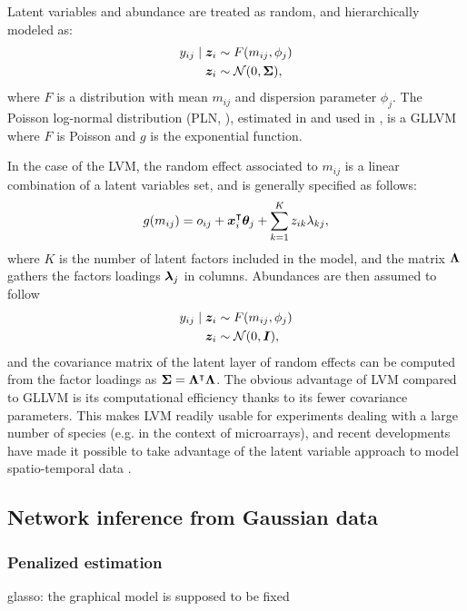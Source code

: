  Latent variables and abundance are treated as random, and hierarchically modeled as:
 \begin{align*}
 y_{ij}\mid {\boldsymbol{z}}_i &\sim F(m_{ij}, \phi_j)\\
 {\boldsymbol{z}}_i &\sim \mathcal{N}(0, {\boldsymbol{\Sigma}}),
 \end{align*} 
 where $F$ is a distribution with mean $m_{ij}$ and dispersion parameter $\phi_j$. The Poisson log-normal distribution (PLN, \citet{AiH89}), estimated in \citet{CMR18} and used in \citet{MRA20}, is a GLLVM where $F$ is Poisson and $g$ is the exponential function.  
 
In the case of the LVM, the random effect associated to $m_{ij}$ is a linear combination of a latent variables set, and is generally specified as follows:
 $$g(m_{ij}) = o_{ij}+{\boldsymbol{x}}_i^\intercal  {\boldsymbol{\theta}}_j +\sum_{k=1}^K z_{ik} \lambda_{kj},$$
 where $K$ is the number of latent factors included in the model, and the matrix ${\boldsymbol{\Lambda}}$ gathers the factors loadings ${\boldsymbol{\lambda}}_j$ in columns. Abundances are then assumed to follow
 \begin{align*}
 y_{ij}\mid {\boldsymbol{z}}_i &\sim F(m_{ij}, \phi_j)\\
{\boldsymbol{z}}_i&\sim \mathcal{N}(0, \boldsymbol{I}),
 \end{align*}
and the covariance matrix of the latent layer of random effects can be computed from the factor loadings as ${\boldsymbol{\Sigma}}={\boldsymbol{\Lambda}}^\intercal {\boldsymbol{\Lambda}}$. The obvious advantage of  LVM compared to GLLVM is  its computational efficiency thanks to its fewer covariance parameters. This makes LVM readily usable for experiments dealing with a large number of species (e.g. in the context of microarrays), and recent developments have made it possible to take advantage of the latent variable approach to model spatio-temporal data \citep{OTN17}.
 
 
\subsection{Network inference from Gaussian data}
 \subsubsection{Penalized estimation}
 glasso: the graphical model is supposed to be fixed
